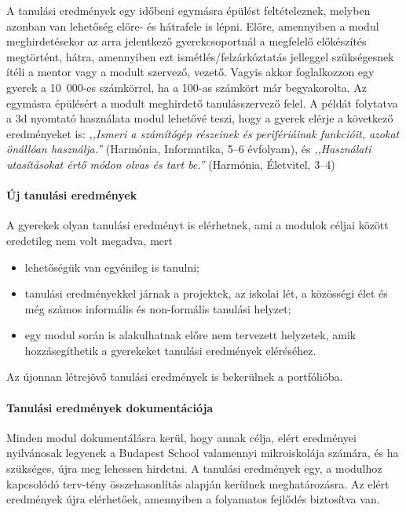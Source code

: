 A tanulási eredmények egy időbeni egymásra épülést feltételeznek,
melyben azonban van lehetőség előre- és hátrafele is lépni. Előre,
amennyiben a modul meghirdetésekor az arra jelentkező gyerekcsoportnál a
megfelelő előkészítés megtörtént, hátra, amennyiben ezt
ismétlés/felzárkóztatás jelleggel szükségesnek ítéli a mentor vagy a modult
szervező, vezető.
Vagyis akkor
foglalkozzon egy gyerek a 10~000-es számkörrel, ha a 100-as számkört már
begyakorolta. Az egymásra épülésért a modult meghirdető tanulásszervező
felel.
A példát folytatva a 3d nyomtató használata modul lehetővé teszi, hogy a
gyerek elérje a következő eredményeket is: \emph{,,Ismeri a számítógép
      részeinek és perifériáinak funkcióit, azokat önállóan használja.''}
(Harmónia, Informatika, 5--6 évfolyam), és  \emph{,,Használati utasításokat
      értő módon olvas és tart be.''} (Harmónia, Életvitel, 3--4)

\paragraph{Új tanulási eredmények}

A gyerekek olyan tanulási eredményt is elérhetnek, ami a modulok céljai
között eredetileg nem volt megadva, mert

\begin{itemize}
      \item lehetőségük van egyénileg is tanulni;

      \item tanulási eredményekkel járnak a projektek, az iskolai lét, a
            közösségi
            élet és még számos informális és non-formális tanulási helyzet;

      \item egy modul során is alakulhatnak előre nem tervezett helyzetek, amik
            hozzásegíthetik a gyerekeket tanulási eredmények eléréséhez.
\end{itemize}

Az újonnan létrejövő tanulási eredmények is bekerülnek a portfólióba.

\paragraph{Tanulási eredmények dokumentációja}

Minden modul dokumentálásra kerül, hogy annak célja, elért eredményei
nyilvánosak legyenek a Budapest School valamennyi mikroiskolája számára,
és ha szükséges, újra meg lehessen hirdetni. A tanulási eredmények egy,
a modulhoz kapcsolódó terv-tény összehasonlítás alapján kerülnek
meghatározásra. Az elért eredmények újra elérhetőek, amennyiben a
folyamatos fejlődés biztosítva van.

